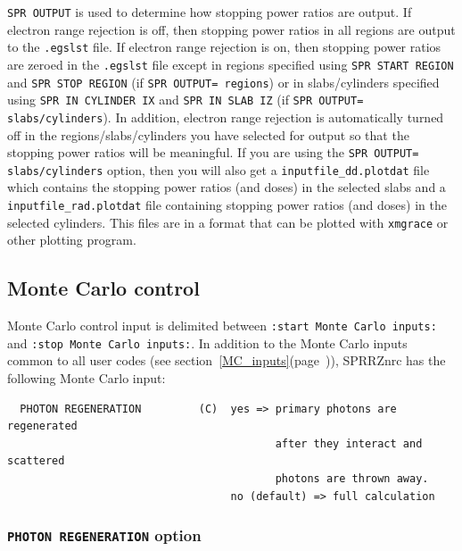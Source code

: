 \documentclass[12pt,twoside]{article}  %
\newcommand{\lpage}[1]{(page~\pageref{#1})}
\begin{document}
{\tt SPR OUTPUT} is used to determine how stopping power ratios are
output.  If electron range rejection is off, then stopping power ratios
in all regions are output to the {\tt .egslst} file.  If electron
range rejection is on, then stopping power ratios are zeroed in the 
{\tt .egslst} file except in regions specified using
{\tt SPR START REGION} and {\tt SPR STOP REGION} (if
{\tt SPR OUTPUT= regions}) or in slabs/cylinders specified using
{\tt SPR IN CYLINDER IX} and {\tt SPR IN SLAB IZ} (if 
{\tt SPR OUTPUT= slabs/cylinders}).  In addition, electron range rejection
is automatically turned off in the regions/slabs/cylinders you have selected
for output so that the stopping power ratios will be meaningful.  If you
are using the {\tt SPR OUTPUT= slabs/cylinders} option, then you will also
get a {\tt inputfile\_dd.plotdat} file which contains the stopping power ratios (and
doses) in the selected slabs and a {\tt inputfile\_rad.plotdat} file
containing stopping power ratios (and doses) in the selected cylinders.
This files are in a format that can be plotted
with {\tt xmgrace} or other plotting program. 

\subsection{Monte Carlo control}

Monte Carlo control input is delimited between 
\verb+:start Monte Carlo inputs:+\\
and \verb+:stop Monte Carlo inputs:+. In addition to the Monte Carlo inputs
common to all user codes (see section~\ref{MC_inputs}\lpage{MC_inputs}),
SPRRZnrc has the following Monte Carlo input:
\begin{verbatim}
  PHOTON REGENERATION         (C)  yes => primary photons are regenerated
                                          after they interact and scattered
                                          photons are thrown away.
                                   no (default) => full calculation

\end{verbatim}

\subsubsection{{\tt PHOTON REGENERATION} option}
\label{photregsect}
\end{document}
